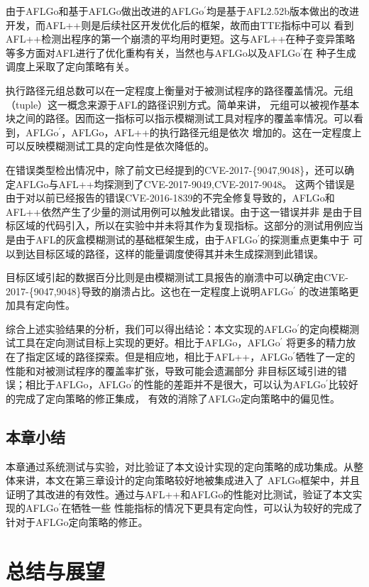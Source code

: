 \documentclass[bachelor]{njupthesis}
\begin{document}
由于AFLGo和基于AFLGo做出改进的AFLGo$^\prime$均是基于AFL2.52b版本做出的改进开发，而AFL++则是后续社区开发优化后的框架，故而由TTE指标中可以
看到AFL++检测出程序的第一个崩溃的平均用时更短。这与AFL++在种子变异策略等多方面对AFL进行了优化重构有关，当然也与AFLGo以及AFLGo$^\prime$在
种子生成调度上采取了定向策略有关。

执行路径元组总数可以在一定程度上衡量对于被测试程序的路径覆盖情况。元组（tuple）这一概念来源于AFL的路径识别方式。简单来讲，
元组可以被视作基本块之间的路径。因而这一指标可以指示模糊测试工具对程序的覆盖率情况。可以看到，AFLGo$^\prime$，AFLGo，AFL++的执行路径元组是依次
增加的。这在一定程度上可以反映模糊测试工具的定向性是依次降低的。

在错误类型检出情况中，除了前文已经提到的CVE-2017-\{9047,9048\}，还可以确定AFLGo与AFL++均探测到了CVE-2017-9049\cite{49CVE},CVE-2017-9048\cite{50CVE}。
这两个错误是由于对以前已经报告的错误CVE-2016-1839\cite{39CVE}的不完全修复导致的，AFLGo和AFL++依然产生了少量的测试用例可以触发此错误。由于这一错误并非
是由于目标区域的代码引入，所以在实验中并未将其作为复现指标。这部分的测试用例应当是由于AFL的灰盒模糊测试的基础框架生成，由于AFLGo$^\prime$的探测重点更集中于
可以到达目标区域的路径，这样的能量调度使得其并未生成探测到此错误。

目标区域引起的数据百分比则是由模糊测试工具报告的崩溃中可以确定由CVE-2017-\{9047,9048\}导致的崩溃占比。这也在一定程度上说明AFLGo$^\prime$
的改进策略更加具有定向性。

综合上述实验结果的分析，我们可以得出结论：本文实现的AFLGo$^\prime$的定向模糊测试工具在定向测试目标上实现的更好。相比于AFLGo，AFLGo$^\prime$
将更多的精力放在了指定区域的路径探索。但是相应地，相比于AFL++，AFLGo$^\prime$牺牲了一定的性能和对被测试程序的覆盖率扩张，导致可能会遗漏部分
非目标区域引进的错误；相比于AFLGo，AFLGo$^\prime$的性能的差距并不是很大，可以认为AFLGo$^\prime$比较好的完成了定向策略的修正集成，
有效的消除了AFLGo定向策略中的偏见性。
\section{本章小结}
本章通过系统测试与实验，对比验证了本文设计实现的定向策略的成功集成。从整体来讲，本文在第三章设计的定向策略较好地被集成进入了
AFLGo框架中，并且证明了其改进的有效性。通过与AFL++和AFLGo的性能对比测试，验证了本文实现的AFLGo$^\prime$在牺牲一些
性能指标的情况下更具有定向性，可以认为较好的完成了针对于AFLGo定向策略的修正。

\chapter{总结与展望}
\end{document}
